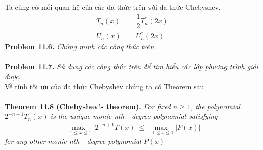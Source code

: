 \documentclass[a4paper,oneside]{book}
\numberwithin{equation}{chapter}
\begin{document}
Ta cũng có mối quan hệ của các đa thức trên với đa thức Chebyshev.
\begin{align}
{T_n}\left( x \right) &= \dfrac{1}{2}T_n^*\left( {2x} \right)\\
{U_n}\left( x \right) &= U_n^*\left( {2x} \right)
\end{align}
\textbf{Problem 11.6.} \textit{Chứng minh các công thức trên.}\\
\\
\textbf{Problem 11.7.} \textit{Sử dụng các công thức trên để tìm hiểu các lớp phương trình giải được.}\\

Về tính tối ưu của đa thức Chebyshev chúng ta có Theorem sau\\
\\
\textbf{Theorem 11.8 (Chebyshev's theorem).} \textit{For fixed $n \ge 1$, the polynomial ${2^{ - n + 1}}{T_n}\left( x \right)$ is the unique monic nth - degree polynomial satisfying
\begin{align}
\mathop {\max }\limits_{ - 1 \le x \le 1} \left| {{2^{ - n + 1}}T\left( x \right)} \right| \le \mathop {\max }\limits_{ - 1 \le x \le 1} \left| {P\left( x \right)} \right|
\end{align}
for any other monic nth - degree polynomial $P\left( x \right)$}
\end{document}
